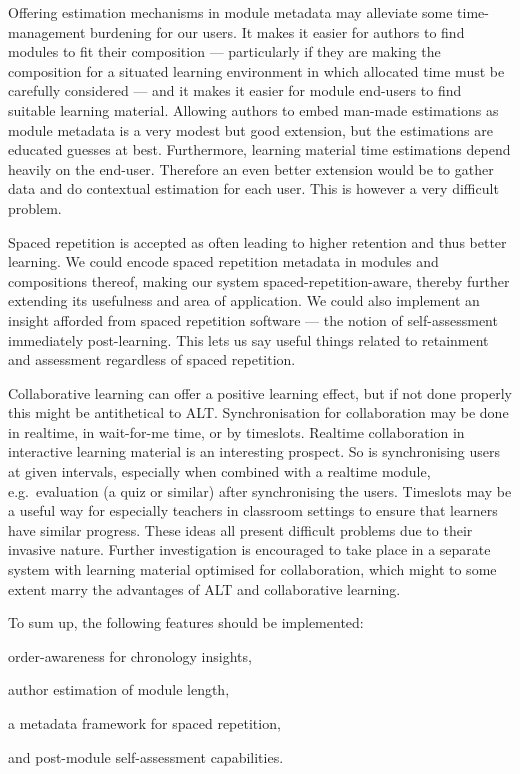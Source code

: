 \documentclass{article}
\begin{document}
\begin{multicols}{2}
Offering estimation mechanisms in module metadata may alleviate some 
time-management burdening for our users. It makes it easier for authors to 
find modules to fit their composition --- particularly if they are making the 
composition for a situated learning environment in which allocated time must 
be carefully considered --- and it makes it easier for module end-users to 
find suitable learning material. Allowing authors to embed man-made 
estimations as module metadata is a very modest but good extension, but the 
estimations are educated guesses at best. Furthermore, learning material time 
estimations depend heavily on the end-user. Therefore an even better extension 
would be to gather data and do contextual estimation for each user. This is 
however a very difficult problem.

Spaced repetition is accepted as often leading to higher retention and thus 
better learning. We could encode spaced repetition metadata in modules and 
compositions thereof, making our system spaced-repetition-aware, thereby 
further extending its usefulness and area of application. We could also 
implement an insight afforded from spaced repetition software --- the notion 
of self-assessment immediately post-learning. This lets us say useful things 
related to retainment and assessment regardless of spaced repetition.

Collaborative learning can offer a positive learning effect, but if not done 
properly this might be antithetical to ALT. Synchronisation for collaboration 
may be done in realtime, in wait-for-me time, or by timeslots. Realtime 
collaboration in interactive learning material is an interesting prospect. So 
is synchronising users at given intervals, especially when combined with a 
realtime module, e.g.\ evaluation (a quiz or similar) after synchronising the 
users. Timeslots may be a useful way for especially teachers in classroom 
settings to ensure that learners have similar progress. These ideas all 
present difficult problems due to their invasive nature. Further investigation 
is encouraged to take place in a separate system with learning material 
optimised for collaboration, which might to some extent marry the advantages 
of ALT and collaborative learning.

To sum up, the following features should be implemented:
\begin{itemize*}
  \item order-awareness for chronology insights,
  \item author estimation of module length,
  \item a metadata framework for spaced repetition,
  \item and post-module self-assessment capabilities.
\end{itemize*}


\end{multicols}
\end{document}
